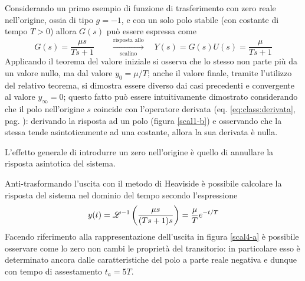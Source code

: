			Considerando un primo esempio di funzione di trasferimento con zero reale nell'origine, ossia di tipo $g = -1$, e con un solo polo stabile (con costante di tempo $T>0$) allora $G(s)$ può essere espressa come
			\[ G(s) = \frac{\mu s}{Ts+1} \qquad \xrightarrow[\textrm{scalino}]{\textrm{risposta allo}} \quad Y(s) = G(s) U(s) = \frac \mu {Ts+1} \]
			Applicando il teorema del valore iniziale si osserva che lo stesso non parte più da un valore nullo, ma dal valore $y_0 = \mu/T$; anche il valore finale, tramite l'utilizzo del relativo teorema, si dimostra essere diverso dai casi precedenti e convergente al valore $y_\infty = 0$; questo fatto può essere intuitivamente dimostrato considerando che il polo nell'origine $s$ coincide con l'operatore derivata (eq. \ref{eq:class:derivata}, pag. \pageref{eq:class:derivata}): derivando la risposta ad un polo (figura \ref{scal1-b}) e osservando che la stessa tende asintoticamente ad una costante, allora la sua derivata è nulla. 
			\begin{concetto}
				L'effetto generale di introdurre un zero nell'origine è quello di annullare la risposta asintotica del sistema.
			\end{concetto}
			Anti-trasformando l'uscita con il metodo di Heaviside è possibile calcolare la risposta del sistema nel dominio del tempo secondo l'espressione
			\[ y(t) = \mathscr {L}^{-1} \left( \frac{\mu s}{(Ts+1)s} \right) = \frac \mu T e^{-t/T} \]
			Facendo riferimento alla rappresentazione dell'uscita in figura \ref{scal4-a} è possibile osservare come lo zero non cambi le proprietà del transitorio: in particolare esso è determinato ancora dalle caratteristiche del polo a parte reale negativa e dunque con tempo di assestamento $t_a = 5T$.
			
			
			
